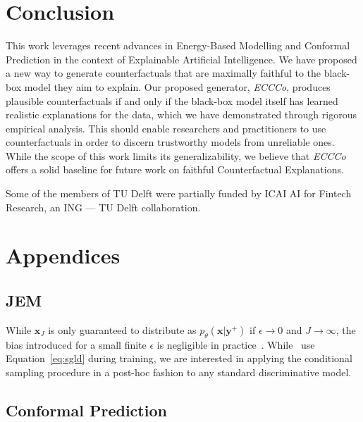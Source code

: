 \documentclass{article}
\begin{document}
\section{Conclusion}

This work leverages recent advances in Energy-Based Modelling and Conformal Prediction in the context of Explainable Artificial Intelligence. We have proposed a new way to generate counterfactuals that are maximally faithful to the black-box model they aim to explain. Our proposed generator, \textit{ECCCo}, produces plausible counterfactuals if and only if the black-box model itself has learned realistic explanations for the data, which we have demonstrated through rigorous empirical analysis. This should enable researchers and practitioners to use counterfactuals in order to discern trustworthy models from unreliable ones. While the scope of this work limits its generalizability, we believe that \textit{ECCCo} offers a solid baseline for future work on faithful Counterfactual Explanations.

\begin{ack}

Some of the members of TU Delft were partially funded by ICAI AI for Fintech Research, an ING — TU Delft
collaboration.

\end{ack}



\appendix
\section*{Appendices}
\renewcommand{\thesubsection}{\Alph{subsection}}

\subsection{JEM}\label{app-jem}

While $\mathbf{x}_J$ is only guaranteed to distribute as $p_{\theta}(\mathbf{x}|\mathbf{y}^+)$ if $\epsilon \rightarrow 0$ and $J \rightarrow \infty$, the bias introduced for a small finite $\epsilon$ is negligible in practice~\citep{murphy2023probabilistic,grathwohl2020your}. While~\citet{grathwohl2020your} use Equation~\ref{eq:sgld} during training, we are interested in applying the conditional sampling procedure in a post-hoc fashion to any standard discriminative model. 

\subsection{Conformal Prediction}\label{app-cp}
\end{document}
